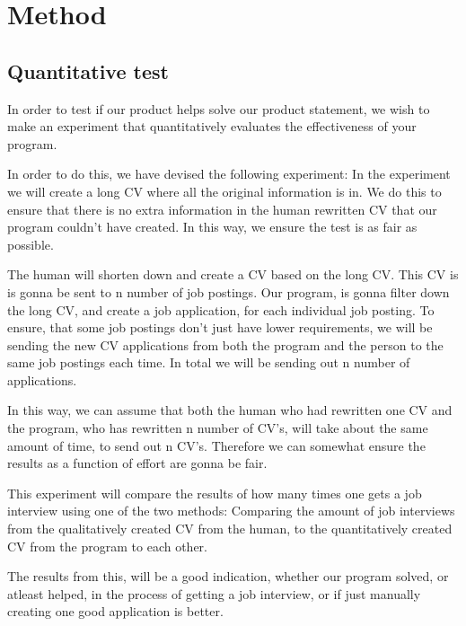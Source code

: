\section{Method}\label{sec:method}
\subsection{Quantitative test}
In order to test if our product helps solve our product statement, we wish
to make an experiment that quantitatively evaluates the effectiveness of your
program. 

In order to do this, we have devised the following experiment:
In the experiment we will create a long CV where all the original information
is in. We do this to ensure that there is no extra information in the human 
rewritten CV that our program couldn't have created. In this way, we ensure
the test is as fair as possible. 

The human will shorten down and create a CV based on the long CV. This CV is
is gonna be sent to n number of job postings.
Our program, is gonna filter down the long CV, and create a job application,
for each individual job posting. 
To ensure, that some job postings don't just have lower requirements, we will be
sending the new CV applications from both the program and the person to the same 
job postings each time. In total we will be sending out n number of applications.

In this way, we can assume that both the human who had rewritten one
CV and the program, who has rewritten n number of CV's,
will take about the same amount of time, to send out n CV's.
Therefore we can somewhat ensure the results as a function of effort are gonna
be fair.

This experiment will compare the results of how many times one gets a job
interview using one of the two methods: Comparing the amount of 
job interviews from the qualitatively created CV from
the human, to the quantitatively created CV from the program to
each other.

The results from this, will be a good indication, whether our program solved, or
atleast helped, in the process of getting a job interview, or if just manually
creating one good application is better.
